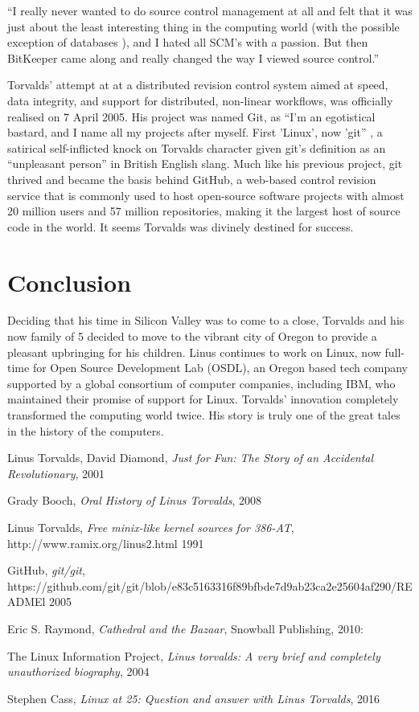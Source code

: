\documentclass{article}
\begin{document}
 ``I really never wanted to do source control management at all and felt
that it was just about the least interesting thing in the computing world (with
the possible exception of databases ), and I hated all SCM’s with a passion.
But then BitKeeper came along and really changed the way I viewed source
control.'' \cite{control} \newline 

Torvalds' attempt at at a distributed revision control system  aimed at speed, data integrity, and support for distributed, non-linear workflows, was officially realised on 7 April 2005. His project was named Git, as ``I'm an egotistical bastard, and I name all my projects after myself. First 'Linux', now 'git'' \cite{git}, a satirical self-inflicted knock on Torvalds character given git’s definition as an ``unpleasant person'' in British English slang. Much like his previous project, git thrived and became the basis behind GitHub, a web-based control revision service that is commonly used to host open-source software projects with almost 20 million users and 57 million repositories, making it the largest host of source code in the world.\cite{figures} It seems Torvalds was divinely destined for success. 

\section{Conclusion} Deciding that his time in Silicon Valley was to come to a close, Torvalds and his now family of 5 decided  to move to the vibrant city of Oregon to provide a pleasant upbringing for his children.  Linus continues to work on Linux, now full-time for Open Source
Development Lab (OSDL), an Oregon based tech company supported by a global consortium of computer companies, including IBM, who maintained their promise of support for Linux. Torvalds' innovation completely transformed the computing world twice. His story is truly one of the great tales in the history of the computers. 

 \begin{thebibliography}{1}

   Linus Torvalds, David Diamond, {\em Just for Fun: The Story of an Accidental Revolutionary}, 2001

   Grady Booch, {\em Oral History of Linus Torvalds},  2008

   Linus Torvalds, {\em Free minix-like kernel sources for 386-AT}, http://www.ramix.org/linus2.html 1991

    GitHub, {\em git/git}, https://github.com/git/git/blob/e83c5163316f89bfbde7d9ab23ca2e25604af290/READMEl 2005

   Eric S. Raymond, {\em  Cathedral and the Bazaar},  Snowball Publishing, 2010:
 

   The Linux Information Project, {\em Linus torvalds: A very brief and completely unauthorized biography}, 2004

  Stephen Cass, {\em Linux at 25: Question and answer with Linus Torvalds}, 2016


  \end{thebibliography}
\end{document}
